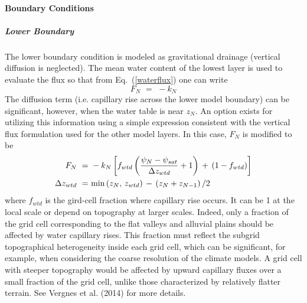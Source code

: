 
\paragraph{Boundary Conditions}
%
\subparagraph{Lower Boundary}
%
The lower boundary condition is modeled as gravitational drainage
(vertical diffusion is neglected). The mean water content of the lowest
layer is used to evaluate the flux
so that from Eq.~(\ref{waterflux}) one can write
%
\begin{equation}
\label{lowerwaterbc}
F_N \,\,=\,\, -k_N 
\end{equation}
%
%
%
The diffusion term
(i.e. capillary rise across the lower model boundary) 
can be significant, however, when the water table is near
$z_N$. An option exists for utilizing this information
using a simple expression consistent with the vertical flux
formulation used for the other model layers.
%
In this case, $F_N$ is modified to be
%
\begin{align}
\label{lowerwaterbcx}
F_N \,\,=&\,\, -k_N \left[
f_{wtd}
\left( \frac{\psi_{N}-\psi_{sat}}{\Delta z_{wtd}} + 1\right)
\,+\, \left(1- f_{wtd}\right)
\right]
\\
\label{lowerwaterbcxz}
\Delta z_{wtd} \,\,=&\,\,
{\rm min}\left( z_N,\,z_{wtd}\right) \,-\,
\left( z_N + z_{N-1}\right)/2
\end{align}
%
where $f_{wtd}$ is the gird-cell fraction 
where capillary rise occurs. It
can be 1 at the local scale or depend on topography at larger
scales. Indeed, only a fraction of the grid cell corresponding to the
flat valleys and alluvial plains should be affected by water
capillary rises. This fraction must reflect the subgrid topographical
heterogeneity inside each grid cell, which can be significant, for
example, 
when considering the coarse resolution of the climate models. A
grid cell with steeper topography would be affected by upward
capillary fluxes over a small fraction of the grid cell, 
unlike those characterized by relatively 
flatter terrain. See 
Vergnes et al. (2014)\nocite{Vergnes2014} for more details.


